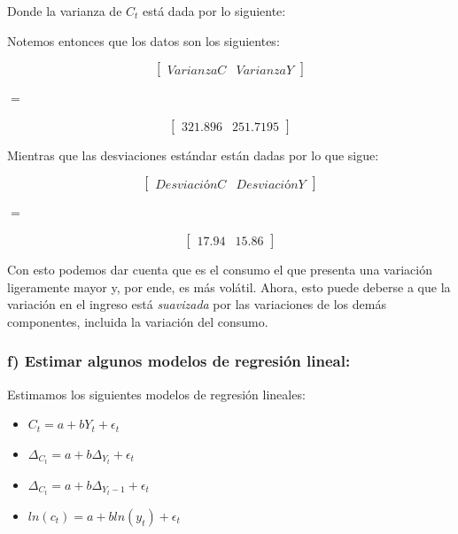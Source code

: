 \documentclass[
]{article}
\providecommand{\tightlist}{%
  \setlength{\itemsep}{0pt}\setlength{\parskip}{0pt}}
\begin{document}
Donde la varianza de \(C_t\) está dada por lo siguiente:

Notemos entonces que los datos son los siguientes:

\begin{equation}
\begin{bmatrix}
Varianza C & Varianza Y 
\end{bmatrix}
\end{equation}

\begin{center}
$=$
\end{center}

\begin{equation}
\begin{bmatrix}
321.896 & 251.7195
\end{bmatrix}
\end{equation}

Mientras que las desviaciones estándar están dadas por lo que sigue:

\begin{equation}
\begin{bmatrix}
Desviación C & Desviación Y 
\end{bmatrix}
\end{equation}

\begin{center}
$=$
\end{center}

\begin{equation}
\begin{bmatrix}
17.94 & 15.86
\end{bmatrix}
\end{equation}

Con esto podemos dar cuenta que es el consumo el que presenta una
variación ligeramente mayor y, por ende, es más volátil. Ahora, esto
puede deberse a que la variación en el ingreso está \emph{suavizada} por
las variaciones de los demás componentes, incluida la variación del
consumo.

\hypertarget{f-estimar-algunos-modelos-de-regresiuxf3n-lineal}{%
\subsubsection{f) Estimar algunos modelos de regresión
lineal:}\label{f-estimar-algunos-modelos-de-regresiuxf3n-lineal}}

Estimamos los siguientes modelos de regresión lineales:

\begin{itemize}
\tightlist
\item
  \(C_t=a + bY_t+\epsilon_t\)
\item
  \(\Delta_{C_t}=a+b\Delta_{Y_t}+\epsilon_t\)
\item
  \(\Delta_{C_t}=a+b\Delta_{Y_t-1}+\epsilon_t\)
\item
  \(ln(c_t)=a+bln(y_t)+\epsilon_t\)
\end{itemize}
\end{document}
